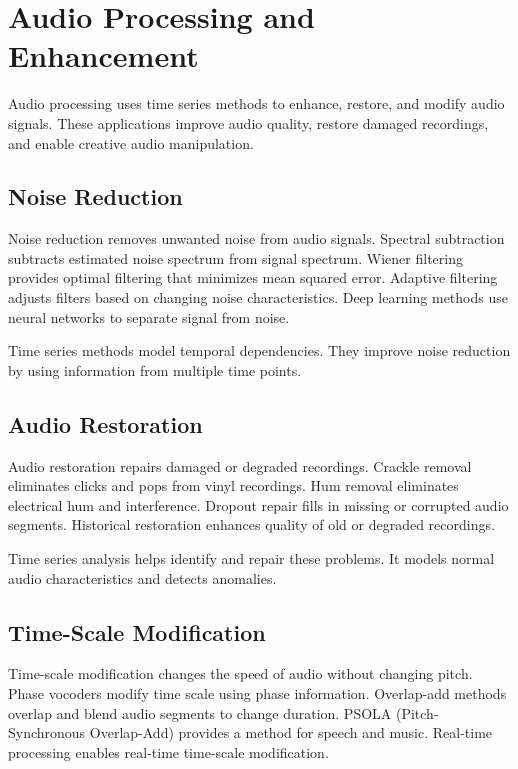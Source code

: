 \section{Audio Processing and Enhancement}

Audio processing uses time series methods to enhance, restore, and modify audio signals. These applications improve audio quality, restore damaged recordings, and enable creative audio manipulation.

\subsection{Noise Reduction}

Noise reduction removes unwanted noise from audio signals. Spectral subtraction subtracts estimated noise spectrum from signal spectrum. Wiener filtering provides optimal filtering that minimizes mean squared error. Adaptive filtering adjusts filters based on changing noise characteristics. Deep learning methods use neural networks to separate signal from noise.

Time series methods model temporal dependencies. They improve noise reduction by using information from multiple time points.

\subsection{Audio Restoration}

Audio restoration repairs damaged or degraded recordings. Crackle removal eliminates clicks and pops from vinyl recordings. Hum removal eliminates electrical hum and interference. Dropout repair fills in missing or corrupted audio segments. Historical restoration enhances quality of old or degraded recordings.

Time series analysis helps identify and repair these problems. It models normal audio characteristics and detects anomalies.

\subsection{Time-Scale Modification}

Time-scale modification changes the speed of audio without changing pitch. Phase vocoders modify time scale using phase information. Overlap-add methods overlap and blend audio segments to change duration. PSOLA (Pitch-Synchronous Overlap-Add) provides a method for speech and music. Real-time processing enables real-time time-scale modification.

